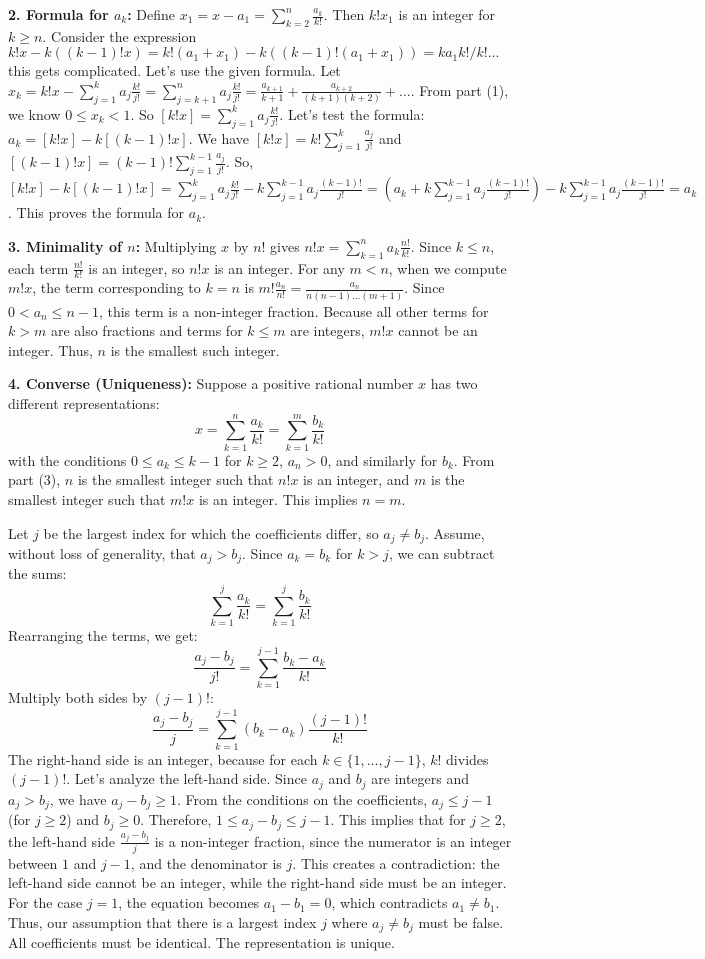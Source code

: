 \textbf{2. Formula for $a_k$:}
Define $x_1 = x - a_1 = \sum_{k=2}^n \frac{a_k}{k!}$. Then $k!x_1$ is an integer for $k \ge n$.
Consider the expression $k!x - k((k-1)!x) = k!(a_1+x_1) - k((k-1)!(a_1+x_1)) = ka_1k!/k! ...$ this gets complicated.
Let's use the given formula. Let $x_k = k!x - \sum_{j=1}^{k} a_j \frac{k!}{j!} = \sum_{j=k+1}^{n} a_j \frac{k!}{j!} = \frac{a_{k+1}}{k+1} + \frac{a_{k+2}}{(k+1)(k+2)} + \dots$.
From part (1), we know $0 \le x_k < 1$. So $[k!x] = \sum_{j=1}^{k} a_j \frac{k!}{j!}$.
Let's test the formula: $a_k = [k!x] - k[(k - 1)!x]$.
We have $[k!x] = k! \sum_{j=1}^k \frac{a_j}{j!}$ and $[(k-1)!x] = (k-1)! \sum_{j=1}^{k-1} \frac{a_j}{j!}$.
So, $[k!x] - k[(k-1)!x] = \sum_{j=1}^k a_j \frac{k!}{j!} - k \sum_{j=1}^{k-1} a_j \frac{(k-1)!}{j!} = \left(a_k + k\sum_{j=1}^{k-1} a_j \frac{(k-1)!}{j!}\right) - k\sum_{j=1}^{k-1} a_j \frac{(k-1)!}{j!} = a_k$.
This proves the formula for $a_k$.

\textbf{3. Minimality of $n$:}
Multiplying $x$ by $n!$ gives $n!x = \sum_{k=1}^n a_k \frac{n!}{k!}$. Since $k \le n$, each term $\frac{n!}{k!}$ is an integer, so $n!x$ is an integer.
For any $m < n$, when we compute $m!x$, the term corresponding to $k=n$ is $m! \frac{a_n}{n!} = \frac{a_n}{n(n-1)\dots(m+1)}$. Since $0 < a_n \le n-1$, this term is a non-integer fraction. Because all other terms for $k>m$ are also fractions and terms for $k\le m$ are integers, $m!x$ cannot be an integer. Thus, $n$ is the smallest such integer.

\textbf{4. Converse (Uniqueness):}
Suppose a positive rational number $x$ has two different representations:
\[ x = \sum_{k=1}^n \frac{a_k}{k!} = \sum_{k=1}^m \frac{b_k}{k!} \]
with the conditions $0 \le a_k \le k-1$ for $k \ge 2$, $a_n > 0$, and similarly for $b_k$.
From part (3), $n$ is the smallest integer such that $n!x$ is an integer, and $m$ is the smallest integer such that $m!x$ is an integer. This implies $n=m$.

Let $j$ be the largest index for which the coefficients differ, so $a_j \neq b_j$. Assume, without loss of generality, that $a_j > b_j$.
Since $a_k = b_k$ for $k > j$, we can subtract the sums:
\[ \sum_{k=1}^j \frac{a_k}{k!} = \sum_{k=1}^j \frac{b_k}{k!} \]
Rearranging the terms, we get:
\[ \frac{a_j - b_j}{j!} = \sum_{k=1}^{j-1} \frac{b_k - a_k}{k!} \]
Multiply both sides by $(j-1)!$:
\[ \frac{a_j - b_j}{j} = \sum_{k=1}^{j-1} (b_k - a_k) \frac{(j-1)!}{k!} \]
The right-hand side is an integer, because for each $k \in \{1, \dots, j-1\}$, $k!$ divides $(j-1)!$.
Let's analyze the left-hand side. Since $a_j$ and $b_j$ are integers and $a_j > b_j$, we have $a_j - b_j \geq 1$.
From the conditions on the coefficients, $a_j \leq j-1$ (for $j \ge 2$) and $b_j \geq 0$.
Therefore, $1 \leq a_j - b_j \leq j-1$.
This implies that for $j \ge 2$, the left-hand side $\frac{a_j - b_j}{j}$ is a non-integer fraction, since the numerator is an integer between $1$ and $j-1$, and the denominator is $j$.
This creates a contradiction: the left-hand side cannot be an integer, while the right-hand side must be an integer.
For the case $j=1$, the equation becomes $a_1 - b_1 = 0$, which contradicts $a_1 \neq b_1$.
Thus, our assumption that there is a largest index $j$ where $a_j \neq b_j$ must be false. All coefficients must be identical. The representation is unique.

